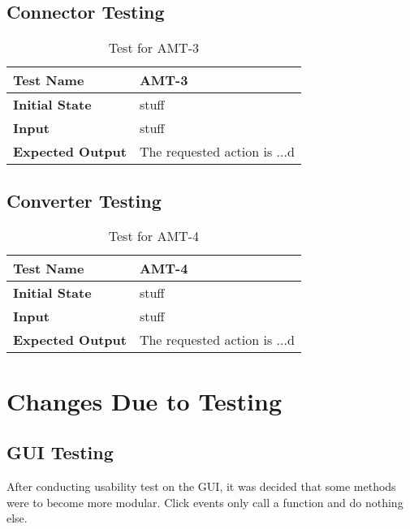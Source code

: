 \documentclass[12pt, titlepage]{article}
\begin{document}
	\subsection{Connector Testing}
	
		\begin{table}[!htbp]
			
			\begin{tabularx}{\textwidth}{|l|X|}
				
				\hline
				
				\textbf{Test Name} & AMT-3
				\\ 
				\hline
				\textbf{Initial State} & stuff \\ 
				\hline
				\textbf{Input} & stuff  \\ 
				\hline 
				\textbf{Expected Output} & The requested action is ...d \\ 
				\hline
				
			\end{tabularx}
			\caption{Test for AMT-3}
			\label{Table}
		\end{table}


	\subsection{Converter Testing}
	
		\begin{table}[!htbp]
			
			\begin{tabularx}{\textwidth}{|l|X|}
				
				\hline
				
				\textbf{Test Name} & AMT-4
				\\ 
				\hline
				\textbf{Initial State} & stuff \\ 
				\hline
				\textbf{Input} & stuff  \\ 
				\hline 
				\textbf{Expected Output} & The requested action is ...d \\ 
				\hline
				
			\end{tabularx}
			\caption{Test for AMT-4}
			\label{Table}
		\end{table}

\section{Changes Due to Testing}
	\subsection{GUI Testing}
	After conducting usability test on the GUI, it was decided that some methods were to become more modular. Click events only call a function and do nothing else.
\end{document}
